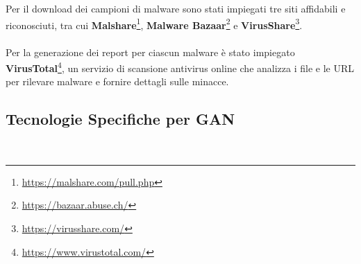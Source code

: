 \\\\
Per il download dei campioni di malware sono stati impiegati tre siti affidabili e riconosciuti, tra cui \textbf{Malshare}\footnote{\url{https://malshare.com/pull.php}}, \textbf{Malware Bazaar}\footnote{\url{https://bazaar.abuse.ch/}} e \textbf{VirusShare}\footnote{\url{https://virusshare.com/}}.
\\\\
Per la generazione dei report per ciascun malware è stato impiegato \textbf{VirusTotal}\footnote{\url{https://www.virustotal.com/}}, un servizio di scansione antivirus online che analizza i file e le URL per rilevare malware e fornire dettagli sulle minacce.




\subsection{Tecnologie Specifiche per GAN}
~\\

